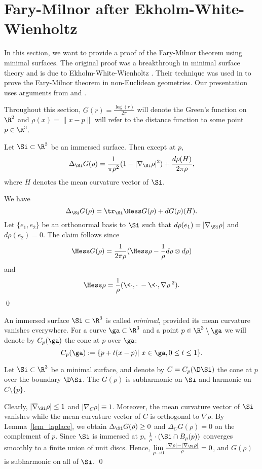 
\section{Fary-Milnor after Ekholm-White-Wienholtz}

In this section, we want to provide a proof of the Fary-Milnor theorem using minimal surfaces.
The original proof was a breakthrough in minimal surface theory and is due to Ekholm-White-Wienholtz \cite{EWW_embed}. 
Their technique was used in \cite{CG_embed, St_structure} to prove the Fary-Milnor theorem in
non-Euclidean geometries. Our presentation uses arguments from \cite{EWW_embed} and \cite{CG_embed}.
\medskip

Throughout this section, $G(r)=\frac{\log(r)}{2\pi}$ will denote the Green's function on $\R^2$ and  $\rho(x)=\|x-p\|$ will refer to
the distance function to some point $p\in\R^3$.

\blem\label{lem_laplace} 
Let $\Si\subset \R^3$ be an immersed surface. Then except at $p$,
\[\Delta_\Si G(\rho)=\frac{1}{\pi\rho^2}(1-|\nabla_\Si \rho|^2)+\frac{d\rho(H)}{2\pi\rho},\]
where $H$ denotes the mean curvature vector of $\Si$. 
\elem

\proof
We have
\[\Delta_\Si G(\rho)=\tr_\Si\Hess G(\rho)+d G(\rho)(H).\]
Let $\{e_1,e_2\}$ be an orthonormal basis to $\Si$ such that $d\rho(e_1)=|\nabla_\Si \rho|$ and $d\rho(e_2)=0$. 
The claim follows since 
\[\Hess G(\rho)=\frac{1}{2\pi\rho}(\Hess\rho-\frac{1}{\rho}d\rho\otimes d\rho)\] 
and
\[\Hess\rho=\frac{1}{\rho}(\<\cdot,\cdot\>-\<\cdot,\nabla\rho\>^2).\]
\qed

\bdfn
An immersed surface $\Si\subset\R^3$ is called {\em minimal}, provided its mean curvature vanishes everywhere.
\edfn
For a curve $\ga\subset\R^3$ and a point $p\in\R^3\setminus\ga$ we will denote by $C_p(\ga)$ the cone at $p$
over $\ga$:
\[C_p(\ga):=\{p+t(x-p)|\ x\in\ga, 0\leq t\leq 1\}.\]
\medskip

\bcor\label{cor_subhar}
Let $\Si\subset\R^3$ be a minimal surface, and denote by $C=C_p(\D\Si)$ the cone at $p$ over the boundary $\D\Si$.
The $G(\rho)$ is subharmonic on $\Si$ and harmonic on $C\setminus\{p\}$.
\ecor

\proof
Clearly, $|\nabla_\Si\rho|\leq 1$ and $|\nabla_C\rho|\equiv 1$.
Moreover, the mean curvature vector of $\Si$ vanishes while the mean curvature vector of $C$
is orthogonal to $\nabla\rho$. By Lemma~\ref{lem_laplace}, we obtain $\Delta_\Si G(\rho)\geq 0$ and $\Delta_C G(\rho)= 0$
on the complement of $p$. Since $\Si$ is immersed at $p$, $\frac{1}{\rho}\cdot(\Si\cap B_\rho(p))$
converges smoothly to a finite union of unit discs. Hence, $\lim\limits_{\rho\to 0}\frac{|\nabla\rho|-|\nabla_\Si\rho|}{\rho}=0$, and
$G(\rho)$ is subharmonic on all of $\Si$.
\qed


